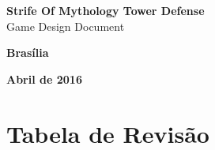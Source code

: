 \documentclass[11pt]{article} %
\begin{document}
\color{white}
\pagestyle{plain}
\def\footnotelayout{\color{white}}
\renewcommand\thefootnote{\textcolor{white}{\arabic{footnote}}}
\begin{titlepage}
 \vfill
  \begin{center}
   {\textbf{{{\Huge  Strife Of Mythology Tower Defense}}}}\\[6cm]


   {{\huge Game Design Document}}\\[6cm]

   \hspace{.45\textwidth} %
  \vfill

\vspace{2cm}

\large \textbf{Brasília}

\large \textbf{Abril de 2016}
\end{center}
\end{titlepage}
\newpage
\color{black}
\tableofcontents

\newpage


\color{white}

\section*{Tabela de Revisão}
\end{document}
